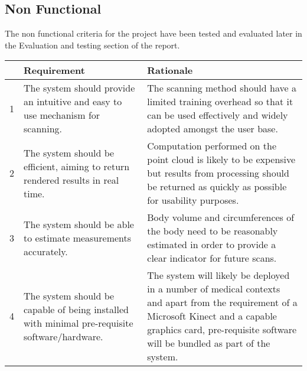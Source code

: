\pagebreak 

\subsection{Non Functional}
\label{spec:non functional}

The non functional criteria for the project have been tested and evaluated later in the Evaluation and testing section of the report.

\begin{longtable}{ | p{0.5cm}|p{5cm}|p{6cm}|} \hline
   & Requirement & Rationale \\ \hline 
  1 & The system should provide an intuitive and easy to use mechanism for scanning. &
    The scanning method should have a limited training overhead so that it can be used effectively and widely adopted amongst the user base. \\ \hline
      2 & The system should be efficient, aiming to return rendered results in real time. &
    Computation performed on the point cloud is likely to be expensive but results from processing should be returned as quickly as possible for usability purposes. \\ \hline
      3 & The system should be able to estimate measurements accurately. &
    Body volume and circumferences of the body need to be reasonably estimated in order to provide a clear indicator for future scans. \\ \hline
      4 & The system should be capable of being installed with minimal pre-requisite software/hardware. &
    The system will likely be deployed in a number of medical contexts and apart from the requirement of a Microsoft Kinect and a capable graphics card, pre-requisite software will be bundled as part of the system. \\ \hline
    
\end{longtable}
